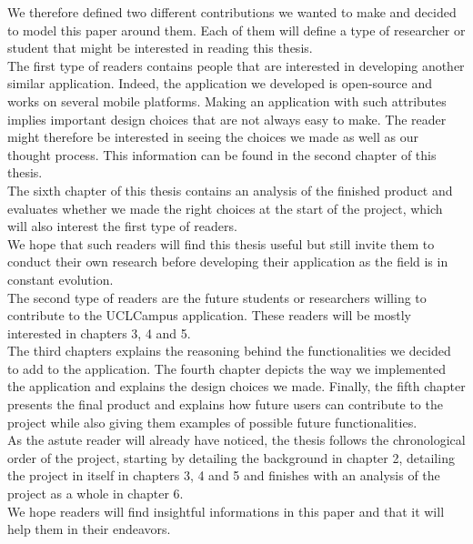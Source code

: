 \documentclass{eplmastersthesis}
\begin{document}
 We therefore defined two different contributions we wanted to make and decided to model this paper around them. Each of them will define a type of researcher or student that might be interested in reading this thesis.\\

The first type of readers contains people that are interested in developing another similar application. Indeed, the application we developed is open-source and works on several mobile platforms. Making an application with such attributes implies important design choices that are not always easy to make. The reader might therefore be interested in seeing the choices we made as well as our thought process. This information can be found in the second chapter of this thesis.\\
The sixth chapter of this thesis contains an analysis of the finished product and evaluates whether we made the right choices at the start of the project, which will also interest the first type of readers.\\
We hope that such readers will find this thesis useful but still invite them to conduct their own research before developing their application as the field is in constant evolution.\\

The second type of readers are the future students or researchers willing to contribute to the UCLCampus application. These readers will be mostly interested in chapters 3, 4 and 5.\\
The third chapters explains the reasoning behind the functionalities we decided to add to the application. The fourth chapter depicts the way we implemented the application and explains the design choices we made. Finally, the fifth chapter presents the final product  and explains how future users can contribute to the project while also giving them examples of possible future functionalities. \\

As the astute reader will already have noticed, the thesis follows the chronological order of the project, starting by detailing the background in chapter 2, detailing the project in itself in chapters 3, 4 and 5 and finishes with an analysis of the project as a whole in chapter 6.\\

We hope readers will find insightful informations in this paper and that it will help them in their endeavors.  
\end{document}

